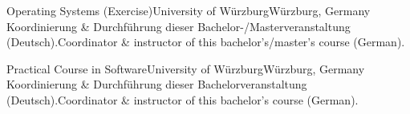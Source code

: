 \begin{cventries}
    {Operating Systems (Exercise)}{University of Würzburg}{Würzburg, Germany}%
    {} %
    {Koordinierung \& Durchführung dieser Bachelor-/Masterveranstaltung (Deutsch).}{Coordinator \& instructor of this bachelor's/master's course (German).}

    {Practical Course in Software}{University of Würzburg}{Würzburg, Germany}%
    {} %
    {Koordinierung \& Durchführung dieser Bachelorveranstaltung (Deutsch).}{Coordinator \& instructor of this bachelor's course (German).}

\end{cventries}
